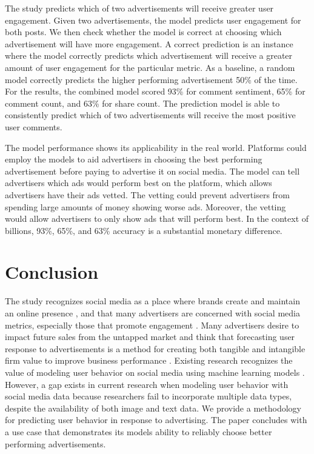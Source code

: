 \documentclass[mksc,blindrev]{informs3} %
\begin{document}
The study predicts which of two advertisements will receive greater user engagement. Given two advertisements, the model predicts user engagement for both posts. We then check whether the model is correct at choosing which advertisement will have more engagement. A correct prediction is an instance where the model correctly predicts which advertisement will receive a greater amount of user engagement for the particular metric. As a baseline, a random model correctly predicts the higher performing advertisement 50\% of the time.  For the results, the combined model scored 93\% for comment sentiment, 65\% for comment count, and 63\% for share count. The prediction model is able to consistently predict which of two advertisements will receive the most positive user comments.

The model performance shows its applicability in the real world.  Platforms could employ the models to aid advertisers in choosing the best performing advertisement before paying to advertise it on social media. The model can tell advertisers which ads would perform best on the platform, which allows advertisers have their ads vetted. The vetting could prevent advertisers from spending large amounts of money showing worse ads. Moreover, the vetting would allow advertisers to only show ads that will perform best. In the context of billions, 93\%, 65\%, and 63\% accuracy is a substantial monetary difference.

\section{Conclusion}

The study recognizes social media as a place where brands create and maintain an online presence \cite{Greenwood2016}, and that many advertisers are concerned with social media metrics, especially those that promote engagement \cite{Tiago2014}. Many advertisers desire to impact future sales from the untapped market \cite{Guo2020} and think that forecasting user response to advertisements is a method for creating both tangible and intangible firm value to improve business performance \cite{Barreto2013}. Existing research recognizes the value of modeling user behavior on social media using machine learning models \cite{Li2015, 8029313, Ohsawa2013, Liu2012, Li2015}. However, a gap exists in current research when modeling user behavior with social media data because researchers fail to incorporate multiple data types, despite the availability of both image and text data. We provide a methodology for predicting user behavior in response to advertising. The paper concludes with a use case that demonstrates its models ability to reliably choose better performing advertisements.
\end{document}
